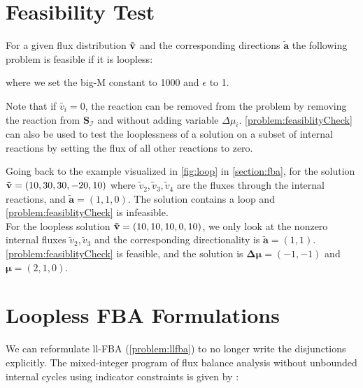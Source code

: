 \section{Feasibility Test} \label{section:feasibility_test}
For a given flux distribution $\bold{\tilde{v}}$ and the corresponding directions $\boldsymbol{\tilde{a}}$ the following problem is feasible if it is loopless:
 where we set the big-M constant to 1000 and $\epsilon$ to 1. 

Note that if $\tilde{v_i} = 0$, the reaction can be removed from the problem by removing the reaction from $\mathbf S_{\mathcal{I}}$ and without adding variable $\Delta \mu_i$. 
\cref{problem:feasiblityCheck} can also be used to test the looplessness of a solution on a subset of internal reactions by setting the flux of all other reactions to zero.

Going back to the example visualized in \cref{fig:loop} in \cref{section:fba}, for the solution $\bold{\tilde v} = (10, 30, 30, -20, 10)$ where $\tilde v_2, \tilde v_3, \tilde v_4$ are the fluxes through the internal reactions, and $\boldsymbol{\tilde a} = (1,1,0)$. The solution contains a loop and \cref{problem:feasiblityCheck} is infeasible. \\
For the loopless solution $\bold{\tilde v} = (10, 10, 10, 0, 10)$, we only look at the nonzero internal fluxes $\tilde v_2, \tilde v_3$ and the corresponding directionality is $\boldsymbol{\tilde a} = (1,1)$. \cref{problem:feasiblityCheck} is feasible, and the solution is $\boldsymbol{\Delta \mu}=(-1, -1)$ and $\boldsymbol \mu = (2,1,0)$. 

\newpage
\section{Loopless FBA Formulations} \label{section:llfba_variants}
We can reformulate \textsf{ll-FBA} (\cref{problem:llfba}) to no longer write the disjunctions explicitly.
The mixed-integer program of flux balance analysis without unbounded internal cycles using indicator constraints is given by \cite{elimination_infeasible_loops}:

